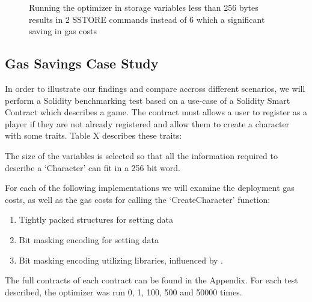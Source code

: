 \begin{figure}[H]
  \begin{subfigure}[b]{\textwidth}
    \centering
    
  \end{subfigure}

  \begin{subfigure}[b]{\textwidth}
    \centering
    
  \end{subfigure}
  \label{struct_optimization}
  \caption{Running the optimizer in storage variables less than 256 bytes results in 2 SSTORE commands instead of 6 which a significant saving in gas costs}
\end{figure}

\subsection{Gas Savings Case Study}
In order to illustrate our findings and compare accross different scenarios, we will perform a Solidity benchmarking test based on a use-case of a Solidity Smart Contract which describes a game. The contract must allows a user to register as a player if they are not already registered and allow them to create a character with some traits. Table X describes these traits:

The size of the variables is selected so that all the information required to describe a `Character' can fit in a 256 bit word.

For each of the following implementations we will examine the deployment gas costs, as well as the gas costs for calling the `CreateCharacter' function:

\begin{enumerate}
    \item Tightly packed structures for setting data
    \item Bit masking encoding for setting data
    \item Bit masking encoding utilizing libraries, influenced by \cite{virtualstruct}.
\end{enumerate}

The full contracts of each contract can be found in the Appendix. 
For each test described, the optimizer was run 0, 1, 100, 500 and 50000 times.
% 

